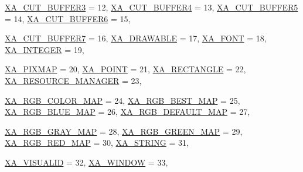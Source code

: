 \begin{DoxyCompactItemize}
\par
\hyperlink{namespace_tao_1_1_platform_1_1_x11_a9042a68c2a3fd29002b5ad9d26f5776a}{XA\_\-CUT\_\-BUFFER3} =  12, 
\hyperlink{namespace_tao_1_1_platform_1_1_x11_a9042a68c2a3fd29002b5ad9d26f5776a}{XA\_\-CUT\_\-BUFFER4} =  13, 
\hyperlink{namespace_tao_1_1_platform_1_1_x11_a9042a68c2a3fd29002b5ad9d26f5776a}{XA\_\-CUT\_\-BUFFER5} =  14, 
\hyperlink{namespace_tao_1_1_platform_1_1_x11_a9042a68c2a3fd29002b5ad9d26f5776a}{XA\_\-CUT\_\-BUFFER6} =  15, 
\par
\hyperlink{namespace_tao_1_1_platform_1_1_x11_a9042a68c2a3fd29002b5ad9d26f5776a}{XA\_\-CUT\_\-BUFFER7} =  16, 
\hyperlink{namespace_tao_1_1_platform_1_1_x11_a9042a68c2a3fd29002b5ad9d26f5776a}{XA\_\-DRAWABLE} =  17, 
\hyperlink{namespace_tao_1_1_platform_1_1_x11_a9042a68c2a3fd29002b5ad9d26f5776a}{XA\_\-FONT} =  18, 
\hyperlink{namespace_tao_1_1_platform_1_1_x11_a9042a68c2a3fd29002b5ad9d26f5776a}{XA\_\-INTEGER} =  19, 
\par
\hyperlink{namespace_tao_1_1_platform_1_1_x11_a9042a68c2a3fd29002b5ad9d26f5776a}{XA\_\-PIXMAP} =  20, 
\hyperlink{namespace_tao_1_1_platform_1_1_x11_a9042a68c2a3fd29002b5ad9d26f5776a}{XA\_\-POINT} =  21, 
\hyperlink{namespace_tao_1_1_platform_1_1_x11_a9042a68c2a3fd29002b5ad9d26f5776a}{XA\_\-RECTANGLE} =  22, 
\hyperlink{namespace_tao_1_1_platform_1_1_x11_a9042a68c2a3fd29002b5ad9d26f5776a}{XA\_\-RESOURCE\_\-MANAGER} =  23, 
\par
\hyperlink{namespace_tao_1_1_platform_1_1_x11_a9042a68c2a3fd29002b5ad9d26f5776a}{XA\_\-RGB\_\-COLOR\_\-MAP} =  24, 
\hyperlink{namespace_tao_1_1_platform_1_1_x11_a9042a68c2a3fd29002b5ad9d26f5776a}{XA\_\-RGB\_\-BEST\_\-MAP} =  25, 
\hyperlink{namespace_tao_1_1_platform_1_1_x11_a9042a68c2a3fd29002b5ad9d26f5776a}{XA\_\-RGB\_\-BLUE\_\-MAP} =  26, 
\hyperlink{namespace_tao_1_1_platform_1_1_x11_a9042a68c2a3fd29002b5ad9d26f5776a}{XA\_\-RGB\_\-DEFAULT\_\-MAP} =  27, 
\par
\hyperlink{namespace_tao_1_1_platform_1_1_x11_a9042a68c2a3fd29002b5ad9d26f5776a}{XA\_\-RGB\_\-GRAY\_\-MAP} =  28, 
\hyperlink{namespace_tao_1_1_platform_1_1_x11_a9042a68c2a3fd29002b5ad9d26f5776a}{XA\_\-RGB\_\-GREEN\_\-MAP} =  29, 
\hyperlink{namespace_tao_1_1_platform_1_1_x11_a9042a68c2a3fd29002b5ad9d26f5776a}{XA\_\-RGB\_\-RED\_\-MAP} =  30, 
\hyperlink{namespace_tao_1_1_platform_1_1_x11_a9042a68c2a3fd29002b5ad9d26f5776a}{XA\_\-STRING} =  31, 
\par
\hyperlink{namespace_tao_1_1_platform_1_1_x11_a9042a68c2a3fd29002b5ad9d26f5776a}{XA\_\-VISUALID} =  32, 
\hyperlink{namespace_tao_1_1_platform_1_1_x11_a9042a68c2a3fd29002b5ad9d26f5776a}{XA\_\-WINDOW} =  33, 

\end{DoxyCompactItemize}

